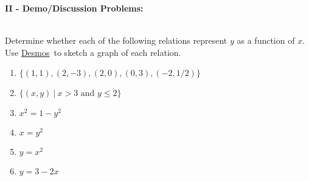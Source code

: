 \documentclass[12pt]{article}
\theoremstyle{definition}
\newcommand{\Desmos}{\href{https://www.desmos.com/}{Desmos}}
\begin{document}
{\bf II - Demo/Discussion Problems:}\\
\ \par
Determine whether each of the following relations represent $y$ as a function of $x$.  Use \Desmos \ to sketch a graph of each relation.
\begin{center}
\begin{multicols}{2}
\begin{enumerate}
\item $\{(1,1),(2,-3),(2,0),(0,3),(-2,1/2)\}$
\item $\{(x,y)~|~x>3 \text{~and~} y\leq 2\}$
\item $x^2=1-y^2$
\item $x=y^2$
\item $y=x^2$
\item $y=3-2x$
\end{enumerate}
\end{multicols}
\end{center}
\end{document}
